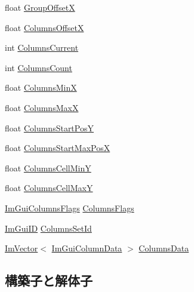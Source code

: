 \begin{DoxyCompactItemize}
\item 
float \mbox{\hyperlink{struct_im_gui_draw_context_a30473e3e4b3eeba6c8d1acdaaedecba9}{Group\+OffsetX}}
\item 
float \mbox{\hyperlink{struct_im_gui_draw_context_af8be098e7ddd1885343725f3fd61ce4a}{Columns\+OffsetX}}
\item 
int \mbox{\hyperlink{struct_im_gui_draw_context_aeeac02b1b1dd8e02e017befff8cf9e34}{Columns\+Current}}
\item 
int \mbox{\hyperlink{struct_im_gui_draw_context_ab068622174203ba86e835980cad066b6}{Columns\+Count}}
\item 
float \mbox{\hyperlink{struct_im_gui_draw_context_ad86d60b4523f423749d944ba56902c83}{Columns\+MinX}}
\item 
float \mbox{\hyperlink{struct_im_gui_draw_context_aa6b05d0a845896193dff628b02f71ba0}{Columns\+MaxX}}
\item 
float \mbox{\hyperlink{struct_im_gui_draw_context_adc5c108aa693534f656018ca095dd2ee}{Columns\+Start\+PosY}}
\item 
float \mbox{\hyperlink{struct_im_gui_draw_context_af1fd970d3806165e93870172231bb1b8}{Columns\+Start\+Max\+PosX}}
\item 
float \mbox{\hyperlink{struct_im_gui_draw_context_a675eb10cf0c56322f8e9a6c40e33a7ea}{Columns\+Cell\+MinY}}
\item 
float \mbox{\hyperlink{struct_im_gui_draw_context_a91c90b98539dc2b1522dd3f7bafa3b21}{Columns\+Cell\+MaxY}}
\item 
\mbox{\hyperlink{imgui_8h_a0edb3053546fcf6c5f7dcb7531c3a17a}{Im\+Gui\+Columns\+Flags}} \mbox{\hyperlink{struct_im_gui_draw_context_acd823cd056a5922a9f3a7c8844451ea7}{Columns\+Flags}}
\item 
\mbox{\hyperlink{imgui_8h_a1785c9b6f4e16406764a85f32582236f}{Im\+Gui\+ID}} \mbox{\hyperlink{struct_im_gui_draw_context_a7bb2cdab76e2b7cc12af2c87eeaafc0a}{Columns\+Set\+Id}}
\item 
\mbox{\hyperlink{class_im_vector}{Im\+Vector}}$<$ \mbox{\hyperlink{struct_im_gui_column_data}{Im\+Gui\+Column\+Data}} $>$ \mbox{\hyperlink{struct_im_gui_draw_context_ae0f7e8f70065e8ddc45d62cf33195a0f}{Columns\+Data}}
\end{DoxyCompactItemize}


\subsection{構築子と解体子}
\mbox{\label{struct_im_gui_draw_context_a0bd8a456860aee49497c58c82a01600c}} 
